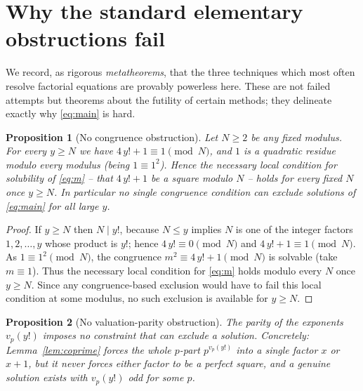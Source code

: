 \documentclass{amsart}
\theoremstyle{plain}
\newtheorem{proposition}{Proposition}
\theoremstyle{remark}
\begin{document}
\section{Why the standard elementary obstructions fail}\label{sec:obstruction}

We record, as rigorous \emph{metatheorems}, that the three techniques which
most often resolve factorial equations are provably powerless here.  These
are not failed attempts but theorems about the futility of certain methods;
they delineate exactly why \eqref{eq:main} is hard.

\begin{proposition}[No congruence obstruction]\label{prop:nocong}
Let $N\ge2$ be any fixed modulus. For every $y\ge N$ we have
$4\,y!+1\equiv1\pmod N$, and $1$ is a quadratic residue modulo every modulus
(being $1\equiv 1^2$). Hence the necessary local condition for solubility of
\eqref{eq:m} -- that $4\,y!+1$ be a square modulo $N$ -- holds for every
fixed $N$ once $y\ge N$. In particular no single congruence condition can
exclude solutions of \eqref{eq:main} for all large $y$.
\end{proposition}

\begin{proof}
If $y\ge N$ then $N\mid y!$, because $N\le y$ implies $N$ is one of the
integer factors $1,2,\dots,y$ whose product is $y!$; hence
$4\,y!\equiv0\pmod N$ and $4\,y!+1\equiv1\pmod N$. As $1\equiv1^2\pmod N$,
the congruence $m^2\equiv4\,y!+1\pmod N$ is solvable (take $m\equiv1$). Thus
the necessary local condition for \eqref{eq:m} holds modulo every $N$ once
$y\ge N$. Since any congruence-based exclusion would have to fail this local
condition at some modulus, no such exclusion is available for $y\ge N$.
\end{proof}

\begin{proposition}[No valuation-parity obstruction]\label{prop:noparity}
The parity of the exponents $v_p(y!)$ imposes \emph{no} constraint that can
exclude a solution. Concretely: Lemma~\ref{lem:coprime} forces the whole
$p$-part $p^{v_p(y!)}$ into a single factor $x$ or $x+1$, but it never forces
either factor to be a perfect square, and a genuine solution exists with
$v_p(y!)$ odd for some $p$.
\end{proposition}
\end{document}

